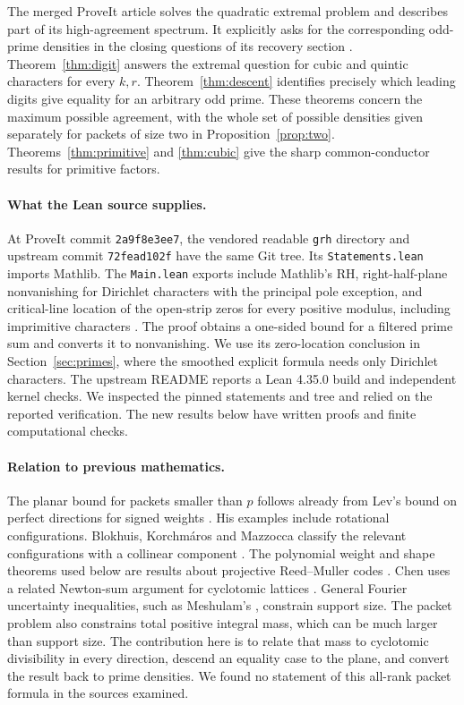 \documentclass[11pt,letterpaper]{article}
\theoremstyle{remark}
\begin{document}
The merged ProveIt article solves the quadratic extremal problem and describes
part of its high-agreement spectrum. It explicitly asks for the corresponding
odd-prime densities in the closing questions of its recovery section
\cite{Article}. Theorem~\ref{thm:digit} answers the extremal question
for cubic and quintic characters for every $k,r$.
Theorem~\ref{thm:descent} identifies precisely which leading digits give
equality for an arbitrary odd prime. These theorems concern the maximum
possible agreement, with the whole set of possible densities given
separately for packets of size two in Proposition~\ref{prop:two}. Theorems~\ref{thm:primitive} and \ref{thm:cubic} give the sharp common-conductor results for primitive factors.

\paragraph{What the Lean source supplies.}
At ProveIt commit \texttt{2a9f8e3ee7}, the vendored readable
\texttt{grh} directory and upstream commit \texttt{72fead102f}
have the same Git tree. Its \texttt{Statements.lean} imports Mathlib.
The \texttt{Main.lean} exports include Mathlib's RH, right-half-plane
nonvanishing for Dirichlet characters with the principal pole exception,
and critical-line location of the open-strip zeros for every positive
modulus, including imprimitive characters \cite{Lean}. The proof obtains
a one-sided bound for a filtered prime sum and converts it to nonvanishing.
We use its zero-location conclusion in Section~\ref{sec:primes}, where the
smoothed explicit formula needs only Dirichlet characters. The upstream
README reports a Lean 4.35.0 build and independent kernel checks. We
inspected the pinned statements and tree and relied on the reported
verification. The new results below have written proofs and finite
computational checks.

\paragraph{Relation to previous mathematics.}
The planar bound for packets smaller than $p$ follows already from Lev's
bound on perfect directions for signed weights \cite{Lev}. His examples
include rotational configurations. Blokhuis, Korchm\'aros and Mazzocca
classify the relevant configurations with a collinear component
\cite{BKM}. The polynomial weight and shape theorems used below are
results about projective Reed--Muller codes \cite{GL}. Chen uses a related
Newton-sum argument for cyclotomic lattices \cite{Chen}. General Fourier
uncertainty inequalities, such as Meshulam's \cite{Meshulam}, constrain
support size. The packet problem also constrains total positive integral
mass, which can be much larger than support size. The contribution here is
to relate that mass to cyclotomic divisibility in every direction, descend
an equality case to the plane, and convert the result back to prime
densities. We found no statement of this all-rank packet formula in the
sources examined.
\end{document}
